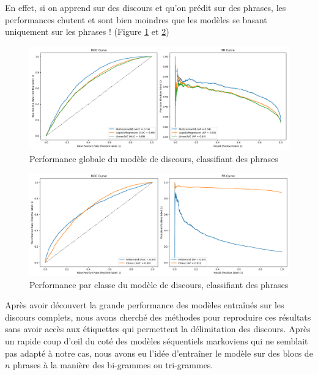 \documentclass{article}
\begin{document}
En effet, si on apprend sur des discours et qu'on prédit sur des phrases, les performances chutent et sont bien moindres que les modèles se basant uniquement sur les phrases ! (Figure \ref{roc_curve_blocks_phrase} et \ref{roc_curve_blocks_classes_phrase})

\begin{figure}[H]
    \centering
    \includegraphics[width=\textwidth]{./src/locuteur/roc_curve_blocks2.png} 
    \caption{Performance globale du modèle de discours, classifiant des phrases}
    \label{roc_curve_blocks_phrase}
\end{figure}

\begin{figure}[H]
    \centering
    \includegraphics[width=\textwidth]{./src/locuteur/roc_curve_blocks2_classes.png} 
    \caption{Performance par classe du modèle de discours, classifiant des phrases}
    \label{roc_curve_blocks_classes_phrase}
\end{figure}

Après avoir découvert la grande performance des modèles entraînés sur les discours complets, nous avons cherché des méthodes pour reproduire ces résultats sans avoir accès aux étiquettes qui permettent la délimitation des discours. Après un rapide coup d'œil du coté des modèles séquentiels markoviens qui ne semblait pas adapté à notre cas, nous avons eu l'idée d'entraîner le modèle sur des blocs de $n$ phrases à la manière des bi-grammes ou tri-grammes.
\end{document}
